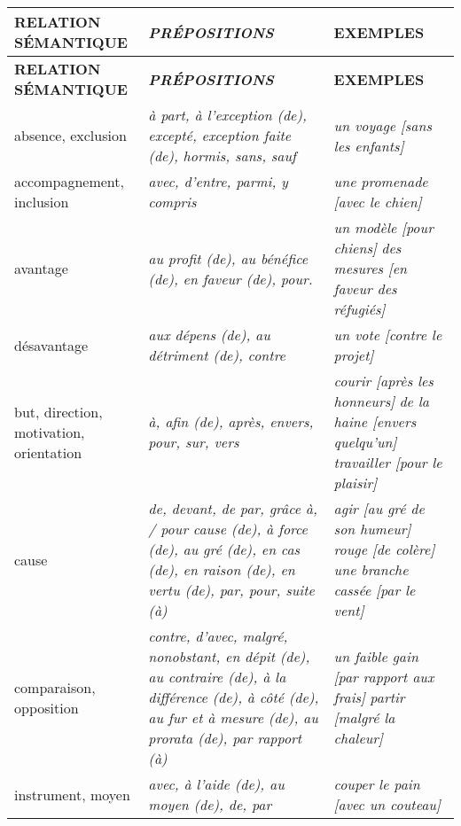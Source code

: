 \documentclass[UTF8]{report}
\begin{document}
\begin{table}[H]
    \centering

\small
\begin{longtable}{|m{4cm}|>{\itshape}m{6cm}|m{5cm}|}
\hline
\rowcolor{cyan!20}
\textbf{RELATION SÉMANTIQUE} & \textbf{\textup{PRÉPOSITIONS}} & \textbf{EXEMPLES} \\
\hline
\endfirsthead
\hline
\textbf{RELATION SÉMANTIQUE} & \textbf{PRÉPOSITIONS} & \textbf{EXEMPLES} \\
\hline
\endhead
\hline
\endfoot
\hline
\endlastfoot

absence, exclusion & à part, à l'exception (de), excepté, exception faite (de), hormis, sans, sauf & \textit{un voyage [sans les enfants]} \\
\hline
accompagnement, inclusion & avec, d'entre, parmi, y compris & \textit{une promenade [avec le chien]} \\
\hline
avantage & au profit (de), au bénéfice (de), en faveur (de), pour. & \textit{un modèle [pour chiens]} \newline \textit{des mesures [en faveur des réfugiés]} \\
\hline
désavantage & aux dépens (de), au détriment (de), contre & \textit{un vote [contre le projet]} \\
\hline
but, direction, motivation, orientation & à, afin (de), après, envers, pour, sur, vers & \textit{courir [après les honneurs]} \newline\textit{de la haine [envers quelqu'un]} \newline \textit{travailler [pour le plaisir]} \\
\hline
cause & de, devant, de par, grâce à, / pour cause (de), à force (de), au gré (de), en cas (de), en raison (de), en vertu (de), par, pour, suite (à) & \textit{agir [au gré de son humeur]} \newline \textit{rouge [de colère]} \newline \textit{une branche cassée [par le vent]} \\
\hline
comparaison, opposition & contre, d'avec, malgré, nonobstant, en dépit (de), au contraire (de), à la différence (de), à côté (de), au fur et à mesure (de), au prorata (de), par rapport (à) & \textit{un faible gain [par rapport aux frais]} \newline \textit{partir [malgré la chaleur]} \\
\hline
instrument, moyen & avec, à l'aide (de), au moyen (de), de, par & \textit{couper le pain [avec un couteau]} \\

\end{longtable}
\end{table}
\end{document}
